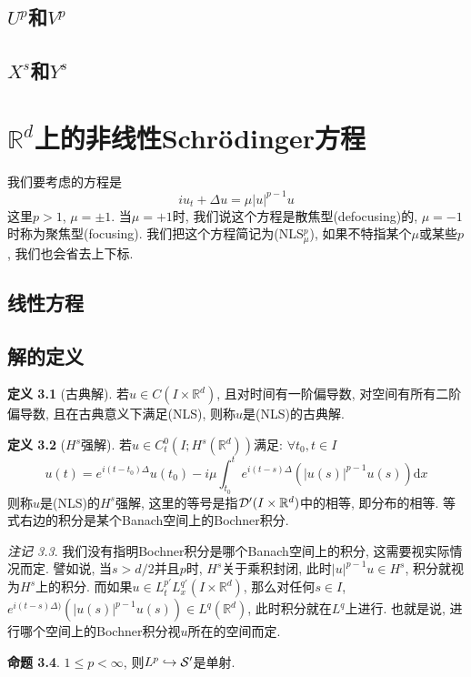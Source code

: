 \documentclass{ctexbook}
\theoremstyle{definition}
\newtheorem{definition}{定义}[section]
\newtheorem{proposition}[definition]{命题}
\theoremstyle{remark}
\newtheorem{remark}[definition]{注记}
\newcommand{\dif}{\mathrm{d}}
\begin{document}
\section{$U^p$和$V^p$}
\section{$X^s$和$Y^s$}

\chapter{$\mathbb{R}^d$上的非线性Schr\"odinger方程}
我们要考虑的方程是
$$iu_t+\Delta u=\mu|u|^{p-1}u$$
这里$p>1$, $\mu=\pm1$. 当$\mu=+1$时, 我们说这个方程是散焦型(defocusing)的, $\mu=-1$时称为聚焦型(focusing). 我们把这个方程简记为(NLS$^p_\mu$), 如果不特指某个$\mu$或某些$p$, 我们也会省去上下标. 
\section{线性方程}
\section{解的定义}
\begin{definition}[古典解]
若$u\in C(I\times\mathbb{R}^d)$, 且对时间有一阶偏导数, 对空间有所有二阶偏导数, 且在古典意义下满足(NLS), 则称$u$是(NLS)的古典解. 
\end{definition}

\begin{definition}[$H^s$强解]
若$u\in C_t^0(I;H^s(\mathbb{R}^d))$满足: $\forall t_0,t\in I$
$$u(t)=e^{i(t-t_0)\Delta}u(t_0)-i\mu\int_{t_0}^te^{i(t-s)\Delta}(|u(s)|^{p-1}u(s))\dif x$$
则称$u$是(NLS)的$H^s$强解, 这里的等号是指${\cal D}'(I\times\mathbb{R}^d)$中的相等, 即分布的相等. 等式右边的积分是某个Banach空间上的Bochner积分.  
\end{definition}

\begin{remark}
我们没有指明Bochner积分是哪个Banach空间上的积分, 这需要视实际情况而定. 譬如说, 当$s>d/2$并且$p$时, $H^s$关于乘积封闭, 此时$|u|^{p-1}u\in H^s$, 积分就视为$H^s$上的积分. 而如果$u\in L^{p'}_tL^{q'}_x(I\times\mathbb{R}^d)$, 那么对任何$s\in I$, $e^{i(t-s)\Delta)}\left(|u(s)|^{p-1}u(s)\right)\in L^q(\mathbb{R}^d)$, 此时积分就在$L^q$上进行. 也就是说, 进行哪个空间上的Bochner积分视$u$所在的空间而定.
\end{remark}

\begin{proposition}
$1\le p<\infty$, 则$L^p\hookrightarrow{\cal S}'$是单射. 
\end{proposition}
\end{document}
